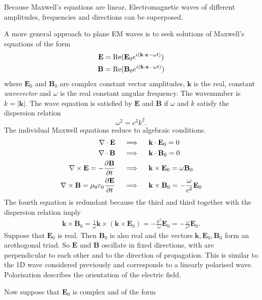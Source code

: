 \documentclass{article}
\begin{document}
Because Maxwell's equations are linear, Electromagnetic waves of different amplitudes, frequencies and directions can be superposed.
\par
A more general approach to plane EM waves is to seek solutions of Maxwell's equations of the form 
\begin{align*}
	\mathbf E &= \operatorname{Re}(\mathbf E_0 e^{i(\mathbf k \cdot \mathbf{x} - \omega t)})\\
	\mathbf B &= \operatorname{Re}(\mathbf B_0 e^{i(\mathbf k\cdot \mathbf{x} - \omega t)})
\end{align*}
where $ \mathbf E_0 $ and $ \mathbf B_0 $ are complex constant vector amplitudes, $ \mathbf k $ is the real, constant \textit{wavevector} and $ \omega $ is the real constant angular frequency. The wavenumber is $ k = |\mathbf k| $. The wave equation is satisfied by $ \mathbf E $ and $ \mathbf B $ if $ \omega $ and $ k $ satisfy the dispersion relation
\[
  \omega^2 = c^2k^2.
\]
The individual Maxwell equations reduce to algebraic conditions.
\begin{align*}
	\nabla\cdot\mathbf E \quad &\implies \quad \mathbf k\cdot\mathbf E_0 = 0\\
	\nabla\cdot\mathbf B \quad&\implies \quad \mathbf k \cdot\mathbf B_0 = 0 \\
	\nabla \times\mathbf E = -\frac{\partial \mathbf B}{\partial t} \quad & \implies \quad \mathbf k \times\mathbf E_0 = \omega \mathbf B_0 \\
	\nabla\times\mathbf B = \mu_0\varepsilon_0\frac{\partial\mathbf E}{\partial t} \quad&\implies \quad \mathbf k \times\mathbf B_0 = -\frac \omega{c^2}\mathbf E_0
\end{align*}
The fourth equation is redundant because the third and third together with the dispersion relation imply
\begin{align*}
	\mathbf k \times\mathbf B_0 = \frac 1 \omega \mathbf k \times(\mathbf k \times\mathbf E_0) = -\frac{k^2}\omega \mathbf E_0 = -\frac\omega{c^2} \mathbf E_0.
\end{align*}
Suppose that $ \mathbf E_0 $ is real. Then $ \mathbf B_0 $ is also real and the vectors $ \mathbf k,\mathbf E_0,\mathbf B_0 $ form an arothogonal triad. So $ \mathbf E $ and $ \mathbf B $ oscillate in fixed directions, with are perpendicular to each other and to the direction of propagation. This is similar to the 1D wave considered previously and corresponds to a linearly polarised wave. Polarisation describes the orientation of the electric field.\par
Now suppose that $ \mathbf E_0 $ is complex and of the form
\end{document}
